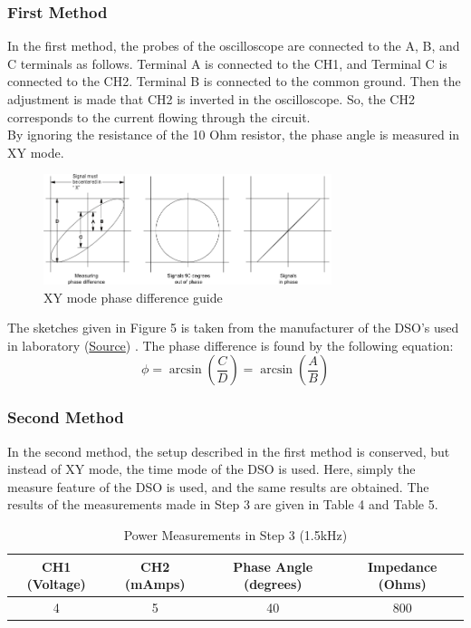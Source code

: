\documentclass[letterpaper,12pt]{article}
\begin{document}
\subsubsection{First Method}
In the first method, the probes of the oscilloscope are connected to the A, B, and C terminals as follows. Terminal A is connected to the CH1, and Terminal C is connected to the CH2. Terminal B is connected to the common ground. Then the adjustment is made that CH2 is inverted in the oscilloscope. So, the CH2 corresponds to the current flowing through the circuit. \\ By ignoring the resistance of the 10 Ohm resistor, the phase angle is measured in XY mode. 
\begin{figure}[H]
    \centering
    \includegraphics[width = 0.75\textwidth]{4PHASE.jpeg}
    \caption{XY mode phase difference guide}
\end{figure} 
The sketches given in Figure 5 is taken from the manufacturer of the DSO's used in laboratory (\href{https://edadocs.software.keysight.com/kkbopen/xy-display-mode-example-589308984.html}{Source}) . The phase difference is found by the following equation: 
\[ 
    \phi = \arcsin(\frac{C}{D}) = \arcsin(\frac{A}{B})
    \]

\subsubsection{Second Method}
In the second method, the setup described in the first method is conserved, but instead of XY mode, the time mode of the DSO is used. Here, simply the measure feature of the DSO is used, and the same results are obtained. The results of the measurements made in Step 3 are given in Table 4 and Table 5.

\begin{table}[H]
    \begin{center}
        \caption{Power Measurements in Step 3 (1.5kHz)}
        \vspace{2mm}
        \begin{tabular}{||c | c | c | c ||} 
            \hline
            CH1 (Voltage) & CH2 (mAmps) & Phase Angle (degrees) & Impedance (Ohms)   \\ [0.5ex] 
            \hline\hline
            4 & 5  & 40    & 800  \\ 
            \hline
        \end{tabular}
\end{center}
\end{table}
\end{document}
